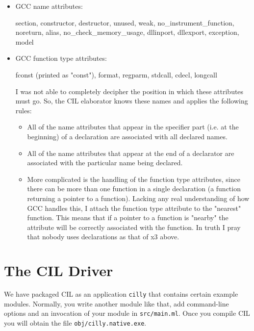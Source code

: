 \documentclass[letterpaper]{article}
\def\t#1{{\tt #1}}
\begin{document}
\begin{itemize}
  \item GCC name attributes:

   section, constructor, destructor, unused, weak, no\_instrument\_function,
   noreturn, alias, no\_check\_memory\_usage, dllinport, dllexport, exception,
   model

  \item GCC function type attributes:

    fconst (printed as "const"), format, regparm, stdcall,
    cdecl, longcall

  I was not able to completely decipher the position in which these attributes
  must go. So, the CIL elaborator knows these names and applies the following
  rules:
  \begin{itemize}
  \item All of the name attributes that appear in the specifier part (i.e. at
  the beginning) of a declaration are associated with all declared names.

  \item All of the name attributes that appear at the end of a declarator are
  associated with the particular name being declared.

  \item More complicated is the handling of the function type attributes, since
     there can be more than one function in a single declaration (a function
     returning a pointer to a function). Lacking any real understanding of how
     GCC handles this, I attach the function type attribute to the "nearest"
     function. This means that if a pointer to a function is "nearby" the
     attribute will be correctly associated with the function. In truth I pray
     that nobody uses declarations as that of x3 above.
  \end{itemize}
\end{itemize}

\section{The CIL Driver}\label{sec-driver}

 We have packaged CIL as an application \t{cilly} that contains certain
example modules. Normally, you write another module like that, add command-line
options and an invocation of your module in \t{src/main.ml}. Once you compile
CIL you will obtain the file \t{obj/cilly.native.exe}.
\end{document}
